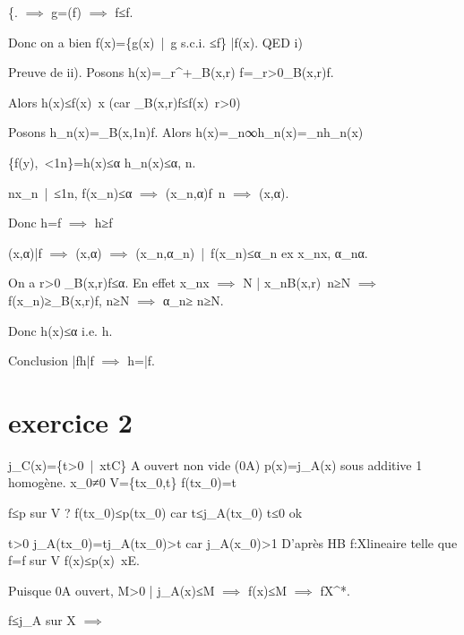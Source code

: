 {{\left\{\right. $\implies$ \epi g\supset{}=\epi(\tilde f) $\implies$ f≤\tilde f.

Donc on a bien
\tilde f(x)=\sup\{g(x)\ |\ g s.c.i. ≤f\} \bar f(x).
QED i)

Preuve de ii). Posons h(x)=\lim_{r^+}\inf_{B(x,r)} f=\sup_{r>0}\inf_{B(x,r)}f.

Alors h(x)≤f(x)\ \forall x (car \inf_{B(x,r)}f≤f(x)\ \forall r>0)

Posons h_n(x)=\inf_{B(x,\frac1n)}f. Alors h(x)=\lim_{n\to ∞}h_n(x)=\sup_{n}h_n(x)

\inf\{f(y),\ <\frac 1n\}=h(x)≤α
h_n(x)≤α, \forall n.

\forall n\exists x_n\ |\ ≤\frac 1n, f(x_n)≤α $\implies$ (x_n,α)\in\epi f\ \forall n $\implies$ (x,α)\in{}.

Donc \epi h\subset{}=\epi\tilde f $\implies$ h≥\tilde f

(x,α)\in\epi\bar f $\implies$ (x,α)\in{} $\implies$ \exists (x_n,α_n)\ |\ f(x_n)≤α_n ex x_n\to x, α_n\to α.

On a \forall r>0 \inf_{B(x,r)}f≤α. En effet x_n\to x $\implies$ \exists N | x_n\in B(x,r)\ \forall n≥N $\implies$ f(x_n)≥\inf_{B(x,r)}f, \forall n≥N $\implies$ α_n≥ \forall n≥N.

Donc h(x)≤α i.e. \in\epi h.

Conclusion \epi\bar f\subset \epi h\subset \epi\bar f $\implies$ h=\bar f.

\section{exercice 2} %
\label{sec:exercise}
j_C(x)=\inf\{t>0\ |\ \frac xt\in C\}
A ouvert non vide (0\in A) p(x)=j_A(x) sous additive 1 homogène.
x_0≠0
V=\{tx_0,t\in \R\} f(tx_0)=t

f≤p sur V ?
f(tx_0)≤p(tx_0) car t≤j_A(tx_0) t≤0 ok

\forall t>0 j_A(tx_0)=tj_A(tx_0)>t
car j_A(x_0)>1
D'après HB
\exists \tilde f:X\rightarrow \R lineaire telle que \tilde f=f sur V
\tilde f(x)≤p(x)\ \forall x\in E.

Puisque 0\in A ouvert, \exists M>0 | j_A(x)≤M $\implies$ \tilde f(x)≤M $\implies$ \tilde f\in X^*.

\tilde f≤j_A sur X $\implies$ 

}}
